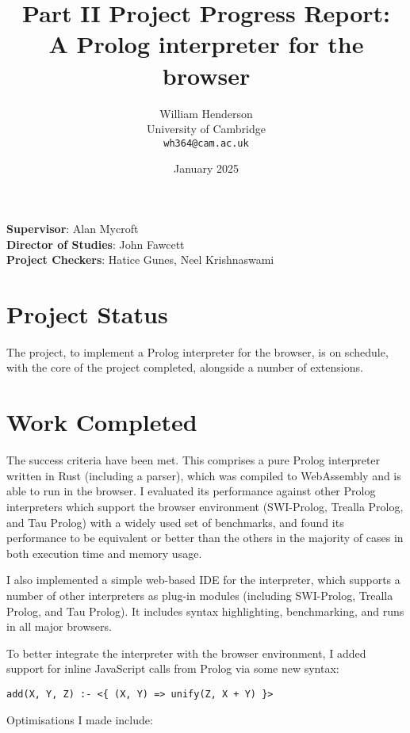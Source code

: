 \documentclass{article}
\title{Part II Project Progress Report:\\
{\bf A Prolog interpreter for the browser}}
\author{William Henderson \\
University of Cambridge \\
\texttt{wh364@cam.ac.uk}}
\date{January 2025}
\begin{document}
\maketitle

{\bf Supervisor}: Alan Mycroft \\
{\bf Director of Studies}: John Fawcett \\
{\bf Project Checkers}: Hatice Gunes, Neel Krishnaswami

\section*{Project Status}

The project, to implement a Prolog interpreter for the browser, is on schedule, with the core of the project completed, alongside a number of extensions.

\section*{Work Completed}

The success criteria have been met. This comprises a pure Prolog interpreter written in Rust (including a parser), which was compiled to WebAssembly and is able to run in the browser. I evaluated its performance against other Prolog interpreters which support the browser environment (SWI-Prolog, Trealla Prolog, and Tau Prolog) with a widely used set of benchmarks, and found its performance to be equivalent or better than the others in the majority of cases in both execution time and memory usage.

I also implemented a simple web-based IDE for the interpreter, which supports a number of other interpreters as plug-in modules (including SWI-Prolog, Trealla Prolog, and Tau Prolog). It includes syntax highlighting, benchmarking, and runs in all major browsers.

To better integrate the interpreter with the browser environment, I added support for inline JavaScript calls from Prolog via some new syntax:
\begin{center}
\texttt{add(X, Y, Z) :- <\{ (X, Y) => unify(Z, X + Y) \}>}
\end{center}

Optimisations I made include:
\end{document}
